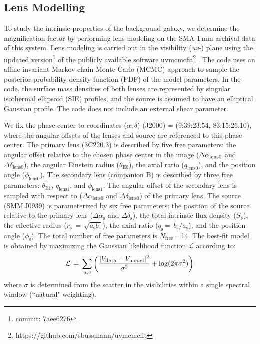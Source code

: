 \documentclass[twocolumn,apj,numberedappendix]{emulateapj}
\begin{document}
\subsection{Lens Modelling} \label{sec:Lens} 
To study the intrinsic properties of the background galaxy, we determine the magnification factor by performing
lens modeling on the SMA 1\,mm archival data of this system. Lens modeling is carried out in the visibility
({\it uv-}) plane using the updated version\footnote{commit: 7aee6276} of the publicly available software {\sc uvmcmcfit}\footnote{https://github.com/sbussmann/uvmcmcfit}
\citep{Bussmann15a}. The code uses an affine-invariant Markov chain Monte Carlo (MCMC) approach to sample the posterior
probability density function (PDF) of the model parameters. In the code, the surface mass densities of both
lenses are represented by singular isothermal ellipsoid (SIE) profiles, and the source is assumed to have an
elliptical Gaussian profile. The code does not include an external shear parameter.

We fix the phase center to coordinates ($\alpha$,\,$\delta$)\,\,(J2000) = (9:39:23.54,\,\,83:15:26.10), where the
angular offsets of the lenses and source are referenced to this phase center. The primary lens (3C220.3) is
described by five free parameters: the angular offset relative to
the chosen phase center in the image ($\Delta \alpha_{\rm
lens0}$ and $\Delta \delta_\textrm{lens0}$), the angular Einstein radius ($\theta_\textrm{E0}$), the
axial ratio ($q_\textrm{lens0}$), and the position angle ($\phi_\textrm{lens0}$). The secondary lens (companion B) is
described by three free parameters: $\theta_\textrm{E1}$, $q_\textrm{lens1}$, and $\phi_\textrm{lens1}$. The angular offset
of the secondary
lens is sampled with respect to ($\Delta \alpha_\textrm{lens0}$ and $\Delta \delta_\textrm{lens0}$) of
the primary lens.
The source (SMM\,J0939) is parameterized by
six free parameters: the position of the source relative to the
primary lens ($\Delta \alpha_\textrm{s}$ and $\Delta
\delta_\textrm{s}$), the total intrinsic flux density ($S_\nu$), the
effective radius ($r_\textrm{s}\,=\,\sqrt{a_\textrm{s} b_\textrm{s}}$), the axial
ratio ($q_\textrm{s}$\,=\, $b_\textrm{s}/a_\textrm{s}$), and the position angle
($\phi_\textrm{s}$).
The total number of free parameters is $N_\textrm{free}$\,=\,14. The best-fit model is obtained by maximizing the
Gaussian likelihood function $ \mathcal{L} $ according to:
\begin{equation}
    \mathcal{L}\,=\,\sum_{u, v}\left( \frac{|V_\textrm{data} - V_{\rm
    model}|^2}{\sigma^2} + {\rm log}(2 \pi \sigma^2) \right)
\end{equation}
\noindent where $\sigma$ is determined from the scatter in the visibilities within a
single spectral window (``natural" weighting).
\end{document}
